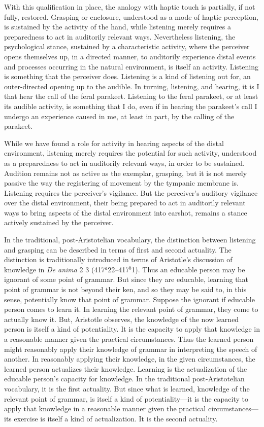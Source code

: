 With this qualification in place, the analogy with haptic touch is partially, if not fully, restored. Grasping or enclosure, understood as a mode of haptic perception, is sustained by the activity of the hand, while listening merely requires a preparedness to act in auditorily relevant ways. Nevertheless listening, the psychological stance, sustained by a characteristic activity, where the perceiver opens themselves up, in a directed manner, to auditorily experience distal events and processes occurring in the natural environment, is itself an activity. Listening is something that the perceiver does. Listening is a kind of listening out for, an outer-directed opening up to the audible. In turning, listening, and hearing, it is I that hear the call of the feral parakeet. Listening to the feral parakeet, or at least its audible activity, is something that I do, even if in hearing the parakeet's call I undergo an experience caused in me, at least in part, by the calling of the parakeet.

While we have found a role for activity in hearing aspects of the distal environment, listening merely requires the potential for such activity, understood as a preparedness to act in auditorily relevant ways, in order to be sustained. Audition remains not as active as the exemplar, grasping, but it is not merely passive the way the registering of movement by the tympanic membrane is. Listening requires the perceiver's vigilance. But the perceiver's auditory vigilance over the distal environment, their being prepared to act in auditorily relevant ways to bring aspects of the distal environment into earshot, remains a stance actively sustained by the perceiver.

In the traditional, post-Aristotelian vocabulary, the distinction between listening and grasping can be described in terms of first and second actuality. The distinction is traditionally introduced in terms of Aristotle's discussion of knowledge in \emph{De anima} 2 3 (417\( ^{a} \)22--417\( ^{b} \)1). Thus an educable person may be ignorant of some point of grammar. But since they are educable, learning that point of grammar is not beyond their ken, and so they may be said to, in this sense, potentially know that point of grammar. Suppose the ignorant if educable person comes to learn it. In learning the relevant point of grammar, they come to actually know it. But, Aristotle observes, the knowledge of the now learned person is itself a kind of potentiality. It is the capacity to apply that knowledge in a reasonable manner given the practical circumstances. Thus the learned person might reasonably apply their knowledge of grammar in interpreting the speech of another. In reasonably applying their knowledge, in the given circumstances, the learned person actualizes their knowledge. Learning is the actualization of the educable person's capacity for knowledge. In the traditional post-Aristotelian vocabulary, it is the first actuality. But since what is learned, knowledge of the relevant point of grammar, is itself a kind of potentiality---it is the capacity to apply that knowledge in a reasonable manner given the practical circumstances---its exercise is itself a kind of actualization. It is the second actuality. 

